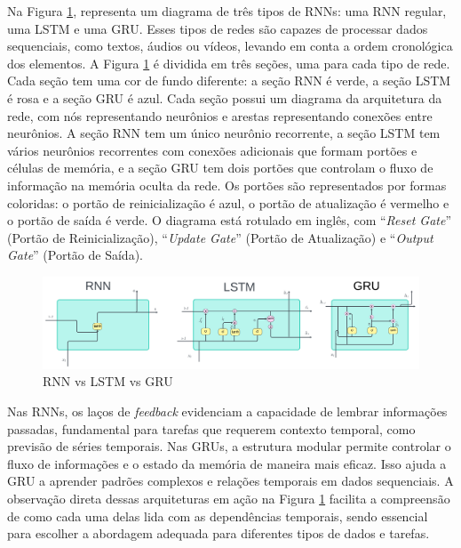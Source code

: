 Na Figura \ref{fig:rnn-vs-lstm-vs-gru-1024x308}, representa um diagrama de três tipos de RNNs: uma RNN regular, uma LSTM e uma GRU. Esses tipos de redes são capazes de processar dados sequenciais, como textos, áudios ou vídeos, levando em conta a ordem cronológica dos elementos. A  Figura \ref{fig:rnn-vs-lstm-vs-gru-1024x308} é dividida em três seções, uma para cada tipo de rede. Cada seção tem uma cor de fundo diferente: a seção RNN é verde, a seção LSTM é rosa e a seção GRU é azul. Cada seção possui um diagrama da arquitetura da rede, com nós representando neurônios e arestas representando conexões entre neurônios. A seção RNN tem um único neurônio recorrente, a seção LSTM tem vários neurônios recorrentes com conexões adicionais que formam portões e células de memória, e a seção GRU tem dois portões que controlam o fluxo de informação na memória oculta da rede. Os portões são representados por formas coloridas: o portão de reinicialização é azul, o portão de atualização é vermelho e o portão de saída é verde. O diagrama está rotulado em inglês, com ``\textit{Reset Gate}'' (Portão de Reinicialização), ``\textit{Update Gate}'' (Portão de Atualização) e ``\textit{Output Gate}'' (Portão de Saída). 

\begin{figure}[H]
	\centering
	\caption{RNN vs LSTM vs GRU}
	\label{fig:rnn-vs-lstm-vs-gru-1024x308}
	\includegraphics[width=1\linewidth]{Apendices/Figuras/modelagem-24h/RNN-vs-LSTM-vs-GRU-1024x308}
	
\end{figure}


Nas RNNs, os laços de \textit{feedback} evidenciam a capacidade de lembrar informações passadas, fundamental para tarefas que requerem contexto temporal, como previsão de séries temporais.
Nas GRUs, a estrutura modular permite controlar o fluxo de informações e o estado da memória de maneira mais eficaz. Isso ajuda a GRU a aprender padrões complexos e relações temporais em dados sequenciais.
A observação direta dessas arquiteturas em ação na Figura \ref{fig:rnn-vs-lstm-vs-gru-1024x308} facilita a compreensão de como cada uma delas lida com as dependências temporais, sendo essencial para escolher a abordagem adequada para diferentes tipos de dados e tarefas.

